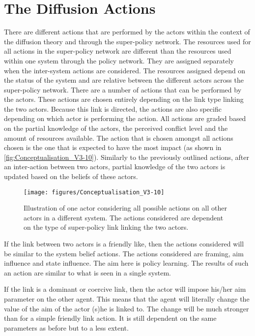 %
\section{The Diffusion Actions}
\label{sec:diffusionActions}

There are different actions that are performed by the actors within the context of the diffusion theory and through the super-policy network. The resources used for all actions in the super-policy network are different than the resources used within one system through the policy network. They are assigned separately when the inter-system actions are considered. The resources assigned depend on the status of the system and are relative between the different actors across the super-policy network. There are a number of actions that can be performed by the actors. These actions are chosen entirely depending on the link type linking the two actors. Because this link is directed, the actions are also specific depending on which actor is performing the action. All actions are graded based on the partial knowledge of the actors, the perceived conflict level and the amount of resources available. The action that is chosen amongst all actions chosen is the one that is expected to have the most impact (as shown in \autoref{fig:Conceptualisation_V3-10}). Similarly to the previously outlined actions, after an inter-action between two actors, partial knowledge of the two actors is updated based on the beliefs of these actors.

\begin{figure}
\centering
\texttt{[image: figures/Conceptualisation\_V3-10]}
\caption{Illustration of one actor considering all possible actions on all other actors in a different system. The actions considered are dependent on the type of super-policy link linking the two actors.}
\label{fig:Conceptualisation_V3-10}
\end{figure}

If the link between two actors is a friendly like, then the actions considered will be similar to the system belief actions. The actions considered are framing, aim influence and state influence. The aim here is policy learning. The results of such an action are similar to what is seen in a single system.

If the link is a dominant or coercive link, then the actor will impose his/her aim parameter on the other agent. This means that the agent will literally change the value of the aim of the actor (s)he is linked to. The change will be much stronger than for a simple friendly link action. It is still dependent on the same parameters as before but to a less extent.

